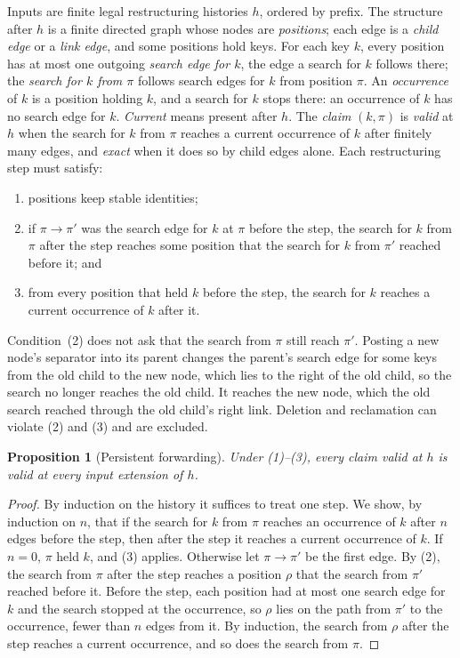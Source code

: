 \documentclass[sigconf]{cidr-2027}
\newtheorem{proposition}{Proposition}
\theoremstyle{remark}
\newcommand{\indesc}{input extension\xspace} %
\begin{document}
Inputs are finite legal restructuring histories $h$, ordered by prefix. The
structure after $h$ is a finite directed graph whose nodes are
\emph{positions}; each edge is a \emph{child edge} or a \emph{link edge}, and
some positions hold keys. For each key $k$, every position has at most one
outgoing \emph{search edge for $k$}, the edge a search for $k$ follows there;
the \emph{search for $k$ from $\pi$} follows search edges for $k$ from position
$\pi$. An \emph{occurrence} of $k$ is a position holding $k$, and a search
for $k$ stops there: an occurrence of $k$ has no search edge for $k$. \emph{Current} means present after $h$. The \emph{claim} $(k,\pi)$ is
\emph{valid} at $h$ when the search for $k$ from $\pi$ reaches a current
occurrence of $k$ after finitely many edges, and \emph{exact} when it does so
by child edges alone. Each restructuring step must satisfy:
\begin{enumerate}
\item
positions keep stable identities;
\item
if $\pi\to\pi'$ was the search edge for $k$ at $\pi$ before the step,
        the search for $k$ from $\pi$ after the step reaches some position
        that the search for $k$ from $\pi'$ reached before it; and
\item
from every position that held $k$ before the step, the search for $k$
        reaches a current occurrence of $k$ after it.
\end{enumerate}
Condition~(2) does not ask that the search from $\pi$ still reach $\pi'$. Posting a new node's separator into its parent changes the parent's search
edge for some keys from the old child to the new node, which lies to the
right of the old child, so the search no longer reaches the old child. It
reaches the new node, which the old search reached through the old child's
right link. Deletion and reclamation can violate (2) and (3) and are
excluded.

\begin{proposition}[Persistent forwarding]
\label{prop:persistent-forwarding}
Under (1)--(3), every claim valid at $h$ is valid at every \indesc of $h$.
\end{proposition}

\begin{proof}
By induction on the history it suffices to treat one step. We show, by
induction on $n$, that if the search for $k$ from $\pi$ reaches an occurrence
of $k$ after $n$ edges before the step, then after the step it reaches a
current occurrence of $k$. If $n=0$, $\pi$ held $k$, and (3) applies. Otherwise let $\pi\to\pi'$ be the first edge. By (2), the search from $\pi$
after the step reaches a position $\rho$ that the search from $\pi'$ reached
before it. Before the step, each position had at most one search edge for $k$
and the search stopped at the occurrence, so $\rho$ lies on the path from
$\pi'$ to the occurrence, fewer than $n$ edges from it. By induction, the
search from $\rho$ after the step reaches a current occurrence, and so does the
search from $\pi$.
\end{proof}
\end{document}

